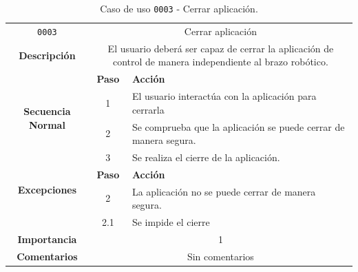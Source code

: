 \begin{table}[H]
    \centering
    \begin{tabularx}{\textwidth}{|c|c|X|}
        \cline{1-3}
        \texttt{0003}        & \multicolumn{2}{c|}{Cerrar aplicación}                                                       
        \\ \cline{1-3}
        \textbf{Descripción} & \multicolumn{2}{m{13cm}|}{El usuario deberá ser capaz de cerrar la aplicación de control de manera independiente al brazo robótico.}
        \\ \cline{1-3}
        \multirow{4}{*}{\textbf{Secuencia Normal}} & \textbf{Paso} & \textbf{Acción}
        \\ \cline{2-3}                    &   1  & El usuario interactúa con la aplicación para cerrarla
        \\ \cline{2-3}                    &   2  & Se comprueba que la  aplicación se puede cerrar de manera segura.
        \\ \cline{2-3}                    &   3  & Se realiza el cierre de la aplicación.
        \\ \cline{1-3}
        \multirow{2}{*}{\textbf{Excepciones}} & \textbf{Paso} & \textbf{Acción}
        \\ \cline{2-3}                        &  2  & La aplicación no se puede cerrar de manera segura.
        \\ \cline{2-3}                        & 2.1 & Se impide el cierre
        \\ \cline{1-3}
        \textbf{Importancia}                 & \multicolumn{2}{c|}{1}           
        \\ \cline{1-3}
        \textbf{Comentarios}                 & \multicolumn{2}{c|}{Sin comentarios}
        \\ \cline{1-3}
    \end{tabularx}
    \caption{Caso de uso \texttt{0003} - Cerrar aplicación.}
    \label{tab:CU0003}
    \label{tab:caso_de_uso_cerrar_aplicación}
\end{table}


